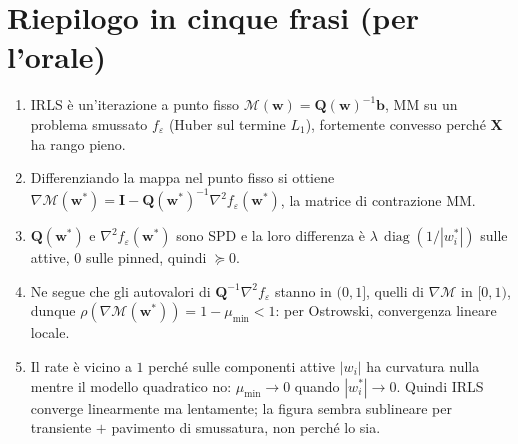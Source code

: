 \documentclass[11pt,a4paper]{article}
\theoremstyle{definition}
\newcommand{\w}{\bm{w}}
\newcommand{\X}{\bm{X}}
\newcommand{\bvec}{\bm{b}}
\newcommand{\Q}{\bm{Q}}
\newcommand{\Id}{\bm{I}}
\newcommand{\wstar}{\w^{*}}
\newcommand{\Mmap}{\mathcal{M}}
\newcommand{\diag}{\operatorname{diag}}
\newcommand{\spec}{\rho}
\newcommand{\lam}{\lambda}
\newcommand{\eps}{\varepsilon}
\begin{document}
\section*{Riepilogo in cinque frasi (per l'orale)}
\begin{enumerate}[leftmargin=*]
\item IRLS è un'iterazione a punto fisso $\Mmap(\w)=\Q(\w)^{-1}\bvec$, MM su un problema
  smussato $f_\eps$ (Huber sul termine $L_1$), fortemente convesso perché $\X$ ha rango pieno.
\item Differenziando la mappa nel punto fisso si ottiene
  $\nabla\Mmap(\wstar)=\Id-\Q(\wstar)^{-1}\nabla^2 f_\eps(\wstar)$, la matrice di contrazione MM.
\item $\Q(\wstar)$ e $\nabla^2 f_\eps(\wstar)$ sono SPD e la loro differenza è
  $\lam\,\diag(1/|w^*_i|)$ sulle attive, $0$ sulle pinned, quindi $\succeq0$.
\item Ne segue che gli autovalori di $\Q^{-1}\nabla^2 f_\eps$ stanno in $(0,1]$, quelli di
  $\nabla\Mmap$ in $[0,1)$, dunque $\spec(\nabla\Mmap(\wstar))=1-\mu_{\min}<1$: per Ostrowski,
  convergenza lineare locale.
\item Il rate è vicino a $1$ perché sulle componenti attive $|w_i|$ ha curvatura nulla mentre
  il modello quadratico no: $\mu_{\min}\to0$ quando $|w^*_i|\to0$. Quindi IRLS converge
  linearmente ma lentamente; la figura sembra sublineare per transiente $+$ pavimento di
  smussatura, non perché lo sia.
\end{enumerate}
\end{document}
